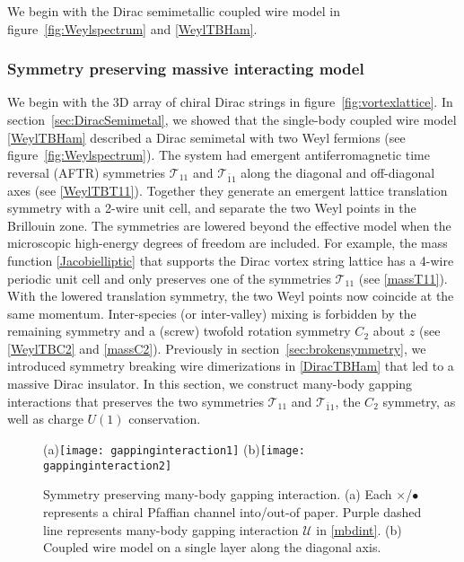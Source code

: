 We begin with the Dirac semimetallic coupled wire model in figure~\ref{fig:Weylspectrum} and \eqref{WeylTBHam}.  


\subsubsection{Symmetry preserving massive interacting model}\label{sec:interactionmodels}

We begin with the 3D array of chiral Dirac strings in figure~\ref{fig:vortexlattice}. In section~\ref{sec:DiracSemimetal}, we showed that the single-body coupled wire model \eqref{WeylTBHam} described a Dirac semimetal with two Weyl fermions (see figure~\ref{fig:Weylspectrum}). The system had emergent antiferromagnetic time reversal (AFTR) symmetries $\mathcal{T}_{11}$ and $\mathcal{T}_{\bar{1}1}$ along the diagonal and off-diagonal axes (see \eqref{WeylTBT11}). Together they generate an emergent lattice translation symmetry with a 2-wire unit cell, and separate the two Weyl points in the Brillouin zone. The symmetries are lowered beyond the effective model when the microscopic high-energy degrees of freedom are included. For example, the mass function \eqref{Jacobielliptic} that supports the Dirac vortex string lattice has a 4-wire periodic unit cell and only preserves one of the \AFTR symmetries $\mathcal{T}_{11}$ (see \eqref{massT11}). With the lowered translation symmetry, the two Weyl points now coincide at the same momentum. Inter-species (or inter-valley) mixing is forbidden by the remaining \AFTR symmetry and a (screw) twofold rotation symmetry $C_2$ about $z$ (see \eqref{WeylTBC2} and \eqref{massC2}). Previously in section~\ref{sec:brokensymmetry}, we introduced symmetry breaking wire dimerizations in \eqref{DiracTBHam} that led to a massive Dirac insulator. In this section, we construct many-body gapping interactions that preserves the two \AFTR symmetries $\mathcal{T}_{11}$ and $\mathcal{T}_{\bar{1}1}$, the $C_2$ symmetry, as well as charge $U(1)$ conservation. 

\begin{figure}[htbp]
\centering
(a)\texttt{[image: gappinginteraction1]}
(b)\texttt{[image: gappinginteraction2]}
\caption{Symmetry preserving many-body gapping interaction. (a) Each {\color{red}$\boldsymbol\times$}/{\color{green}$\bullet$} represents a chiral Pfaffian channel into/out-of paper. Purple dashed line represents many-body gapping interaction $\mathcal{U}$ in \eqref{mbdint}. (b) Coupled wire model on a single layer along the diagonal axis.}\label{fig:gappinginteraction}
\end{figure}

